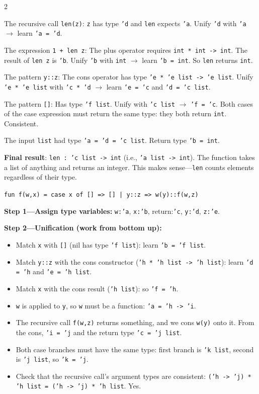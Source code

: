 \documentclass[9pt,landscape]{extarticle}
\begin{document}
\begin{multicols}{2}
\begin{exambox}
The recursive call \texttt{len(z)}: \texttt{z} has type \texttt{'d} and \texttt{len} expects \texttt{'a}. Unify \texttt{'d} with \texttt{'a} $\to$ learn \texttt{'a = 'd}.

The expression \texttt{1 + len z}: The plus operator requires \texttt{int * int -> int}. The result of \texttt{len z} is \texttt{'b}. Unify \texttt{'b} with \texttt{int} $\to$ learn \texttt{'b = int}. So \texttt{len} returns \texttt{int}.

The pattern \texttt{y::z}: The cons operator has type \texttt{'e * 'e list -> 'e list}. Unify \texttt{'e * 'e list} with \texttt{'c * 'd} $\to$ learn \texttt{'e = 'c} and \texttt{'d = 'c list}.

The pattern \texttt{[]}: Has type \texttt{'f list}. Unify with \texttt{'c list} $\to$ \texttt{'f = 'c}. Both cases of the case expression must return the same type: they both return \texttt{int}. Consistent.

The input \texttt{list} had type \texttt{'a = 'd = 'c list}. Return type \texttt{'b = int}.

\textbf{Final result}: \texttt{len : 'c list -> int} (i.e., \texttt{'a list -> int}). The function takes a list of anything and returns an integer. This makes sense---\texttt{len} counts elements regardless of their type.
\end{exambox}

\begin{exambox}
\texttt{fun f(w,x) = case x of [] => [] | y::z => w(y)::f(w,z)}

\textbf{Step 1---Assign type variables:} \texttt{w:'a}, \texttt{x:'b}, return:\texttt{'c}, \texttt{y:'d}, \texttt{z:'e}.

\textbf{Step 2---Unification (work from bottom up):}
\begin{itemize}
  \item Match \texttt{x} with \texttt{[]} (nil has type \texttt{'f list}): learn \texttt{'b = 'f list}.
  \item Match \texttt{y::z} with the cons constructor (\texttt{'h * 'h list -> 'h list}): learn \texttt{'d = 'h} and \texttt{'e = 'h list}.
  \item Match \texttt{x} with the cons result (\texttt{'h list}): so \texttt{'f = 'h}.
  \item \texttt{w} is applied to \texttt{y}, so \texttt{w} must be a function: \texttt{'a = 'h -> 'i}.
  \item The recursive call \texttt{f(w,z)} returns something, and we cons \texttt{w(y)} onto it. From the cons, \texttt{'i = 'j} and the return type \texttt{'c = 'j list}.
  \item Both case branches must have the same type: first branch is \texttt{'k list}, second is \texttt{'j list}, so \texttt{'k = 'j}.
  \item Check that the recursive call's argument types are consistent: \texttt{('h -> 'j) * 'h list = ('h -> 'j) * 'h list}. Yes.
\end{itemize}


\end{exambox}
\end{multicols}
\end{document}
